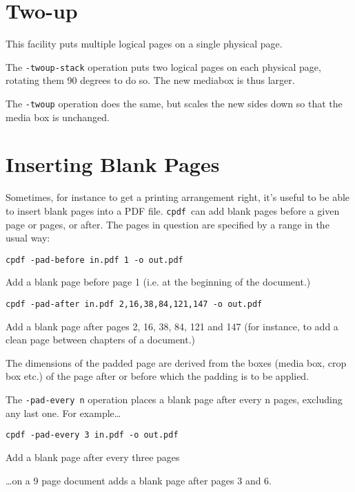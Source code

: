 \documentclass{book}
\newcommand{\cpdf}{\texttt{cpdf}}
\begin{document}
  \section{Two-up}
    This facility puts multiple logical pages on a single physical page. 

The \texttt{-twoup-stack} operation puts two logical pages on each physical
page, rotating them 90 degrees to do so. The new mediabox is thus larger.

The \texttt{-twoup} operation does the same, but scales the new sides down so
that the media box is unchanged.

  \section{Inserting Blank Pages}
  Sometimes, for instance to get a printing arrangement right, it's useful to
be able to insert blank pages into a PDF file. \cpdf\ can add blank pages
before a given page or pages, or after. The pages in question are specified by
a range in the usual way:
  \begin{framed}
    \small\verb!cpdf -pad-before in.pdf 1 -o out.pdf!
 
    \vspace{2.5mm}
    \noindent Add a blank page before page 1 (i.e. at the beginning of the document.)

    \vspace{2.5mm}
    \verb!cpdf -pad-after in.pdf 2,16,38,84,121,147 -o out.pdf!

    \vspace{2.5mm}
    \noindent Add a blank page after pages 2, 16, 38, 84, 121 and 147 (for
instance, to add a clean page between chapters of a document.)
  \end{framed}
  \noindent The dimensions of the padded page are derived from the boxes (media box, crop box etc.) of the page after or before which the padding is to be applied.

  The \verb!-pad-every n! operation places a blank page after every n pages, excluding any last one. For example\ldots
  \begin{framed}
    \small\verb!cpdf -pad-every 3 in.pdf -o out.pdf!
 
    \vspace{2.5mm}
    \noindent Add a blank page after every three pages
  \end{framed}
  \noindent\ldots on a 9 page document adds a blank page after pages 3 and 6.
\end{document}

